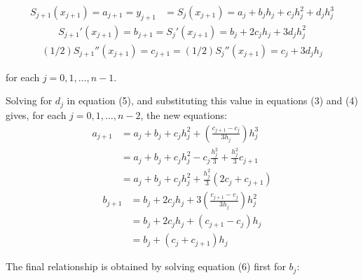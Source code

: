 \documentclass{article}
\theoremstyle{definition}
\begin{document}
\begin{align}
S_{j+1}(x_{j+1}) = a_{j+1} = y_{j+1} &= S_{j}(x_{j+1})
= a_j + b_j h_j + c_j h_j^2 + d_j h_j^3        
\end{align}
\begin{align}
    S_{j+1}'(x_{j+1}) = b_{j+1} = S_{j}'(x_{j+1}) = b_j + 2c_jh_j + 3d_jh_j^2
\end{align}
\begin{align}
    (1/2)S_{j+1}''(x_{j+1}) = c_{j+1} = (1/2)S_j''(x_{j+1}) = c_j + 3d_j h_j
\end{align}

for each $j=0,1,\ldots,n-1$. 

Solving for $d_j$ in equation (5), and substituting this value in equations (3) and (4) gives, for each $j=0,1,\ldots,n-2$, the new equations:
\begin{equation}
    \begin{split}
        a_{j+1} &= a_j + b_j + c_j h_j^2 + \left(\frac{c_{j+1} - c_j}{3h_j}\right)h_j^3\\
        &=  a_j + b_j + c_j h_j^2 - c_j\frac{h_j^2}{3} + \frac{h_j^2}{3} c_{j+1}\\
        &=  a_j + b_j + c_j h_j^2 + \frac{h_j^2}{3}(2c_j + c_{j+1})
    \end{split}
\end{equation}
\begin{equation}
    \begin{split}
        b_{j+1} &= b_j + 2c_jh_j + 3\left(\frac{c_{j+1} - c_j}{3h_j}\right)h_j^2\\
        &= b_j + 2c_jh_j + (c_{j+1} - c_j)h_j\\
        &= b_j + (c_j + c_{j+1})h_j
    \end{split}
\end{equation}

The final relationship is obtained by solving equation (6) first for $b_j$:
\end{document}
